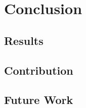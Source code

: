 \chapter{Conclusion}\label{chap:conclusion}

\section{Results}\label{sec:conclusion-results}

\section{Contribution}\label{sec:conclusion-contribution}

\section{Future Work}\label{sec:conclusion-future}

